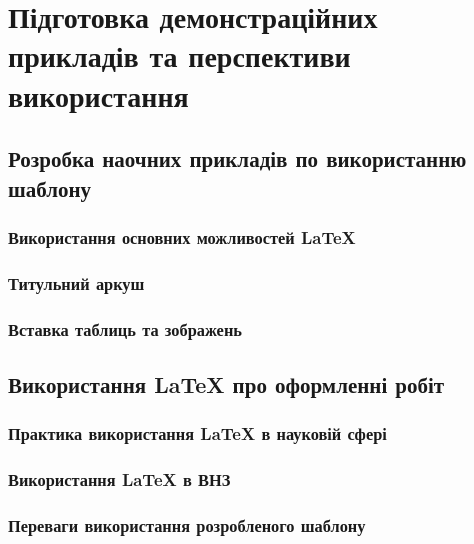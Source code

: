 \chapter{Підготовка демонстраційних прикладів та перспективи використання} \label{chap:first}
%
%
%
%
%
\section{Розробка наочних прикладів по використанню шаблону}
%
%
\subsection{Використання основних можливостей \LaTeX{}}
%
%
\subsection{Титульний аркуш}
%
%
\subsection{Вставка таблиць та зображень}
%
%
%
%
%
\section{Використання \LaTeX{} про оформленні робіт}
%
%
\subsection{Практика використання \LaTeX{} в науковій сфері}
%
%
\subsection{Використання \LaTeX{} в ВНЗ}
%
%
\subsection{Переваги використання розробленого шаблону}
